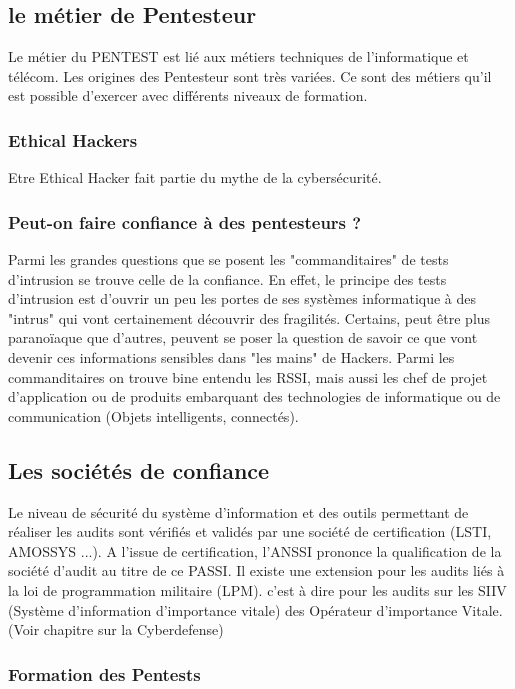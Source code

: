 \subsection{le métier de Pentesteur}

Le métier du PENTEST est  lié aux métiers techniques de l'informatique et télécom. Les origines des Pentesteur sont très variées.
Ce sont des métiers qu'il est possible d'exercer avec différents niveaux de formation. 

\subsubsection{ Ethical Hackers}
Etre Ethical Hacker fait partie du mythe de la cybersécurité.

\subsubsection{Peut-on faire confiance à des pentesteurs ?}
Parmi les grandes questions que se posent les "commanditaires" de tests d'intrusion se trouve celle de la confiance.
En effet, le principe des tests d'intrusion est d'ouvrir un peu les portes de ses systèmes informatique à des "intrus" qui vont certainement découvrir des fragilités.
Certains, peut être plus paranoïaque que d'autres, peuvent se poser la question de savoir ce que vont devenir ces informations sensibles dans "les mains" de Hackers.
Parmi les commanditaires on trouve bine entendu les RSSI, mais aussi les chef de projet d'application ou de produits embarquant des technologies de informatique ou de communication (Objets intelligents, connectés).

\subsection{Les sociétés de confiance}



Le niveau de sécurité du système d'information et des  outils permettant de réaliser les audits sont vérifiés et validés par une société de certification (LSTI, AMOSSYS ...). A l'issue de certification, l'ANSSI prononce la qualification de la société d'audit au titre de ce PASSI. Il existe une extension pour les audits liés à la loi de programmation militaire (LPM). c'est à dire pour les audits sur les SIIV (Système d'information d'importance vitale) des Opérateur d'importance Vitale. (Voir chapitre sur la Cyberdefense)

\subsubsection{Formation des Pentests}

